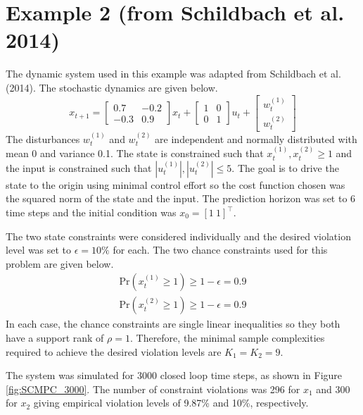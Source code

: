 \documentclass[12 pt]{report}
\begin{document}
\section{Example 2 (from Schildbach et al. 2014)}

The dynamic system used in this example was adapted from Schildbach et al. (2014). The stochastic dynamics are given below. 
\begin{equation*}
x_{t+1} = \begin{bmatrix}
0.7 & -0.2 \\ -0.3 & 0.9
\end{bmatrix} x_t + 
\begin{bmatrix}
1 & 0 \\ 0 & 1
\end{bmatrix} u_t + 
\begin{bmatrix}
w_t^{(1)} \\ w_t^{(2)}
\end{bmatrix}
\end{equation*}
The disturbances $w_t^{(1)}$ and $w_t^{(2)}$ are independent and normally distributed with mean 0 and variance 0.1. The state is constrained such that $x_t^{(1)},  x_t^{(2)} \geq 1$ and the input is constrained such that $|u_t^{(1)}|, |u_t^{(2)}| \leq 5$. The goal is to drive the state to the origin using minimal control effort so the cost function chosen was the squared norm of the state and the input. The prediction horizon was set to 6 time steps and the initial condition was $x_0 = [1~ 1]^\top$.

The two state constraints were considered individually and the desired violation level was set to $\epsilon = 10\%$ for each. The two chance constraints used for this problem are given below.
\begin{align*}
\mathrm{Pr} (x_t^{(1)} \geq 1) \geq 1 - \epsilon = 0.9 \\
\mathrm{Pr} (x_t^{(2)} \geq 1) \geq 1 - \epsilon = 0.9
\end{align*}
In each case, the chance constraints are single linear inequalities so they both have a support rank of $\rho = 1$. Therefore, the minimal sample complexities required to achieve the desired violation levels are $K_1 = K_2 = 9$.

The system was simulated for 3000 closed loop time steps, as shown in Figure \ref{fig:SCMPC_3000}. The number of constraint violations was 296 for $x_1$ and 300 for $x_2$ giving empirical violation levels of 9.87\% and 10\%, respectively.
\end{document}
